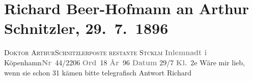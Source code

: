 

               \section[Richard Beer-Hofmann an Arthur Schnitzler, 29. 7. 1896]{ Richard Beer-Hofmann an Arthur Schnitzler, 29. 7. 1896}\nopagebreak{}\rehead{ }\begin{ledgroupsized}[t]{13cm}\normalsize\beginnumbering{} \toendnotes[C]{\smallbreak\pagebreak[2]} 
\pstart{}{\pb}\textsc{Doktor Arthur}\pend{}\pstart{}\textsc{Schnitzler}\pend{}\pstart{}\textsc{poste restante Stcklm}\pend{}{\bigskip}\pstart
           {\pb}\textcolor{gray}{\textbf{Inlemnadt i}}{ }Köpenhamn\textcolor{gray}{\textbf{Nr}} 44/2206{ }\textcolor{gray}{\textbf{Ord}} 18{ }\textcolor{gray}{\textbf{År}} 96{ }\textcolor{gray}{\textbf{Datum}}{ }29/7{ }\textcolor{gray}{\textbf{Kl.}} 2e\pend
           \pstart
           Wäre mir lieb, wenn sie schon 31 kämen bitte telegrafisch Antwort\pend
           \pstart \spacefill\mbox{Richard}\pend{}          \endnumbering{}\end{ledgroupsized}  \newcommand{\dateiname}{L00573}\newcommand{\titel}{Richard Beer-Hofmann an Arthur Schnitzler, 29. 7. 1896}\newcommand{\editorInnen}{Martin Anton Müller und Gerd-Hermann Susen}
      
